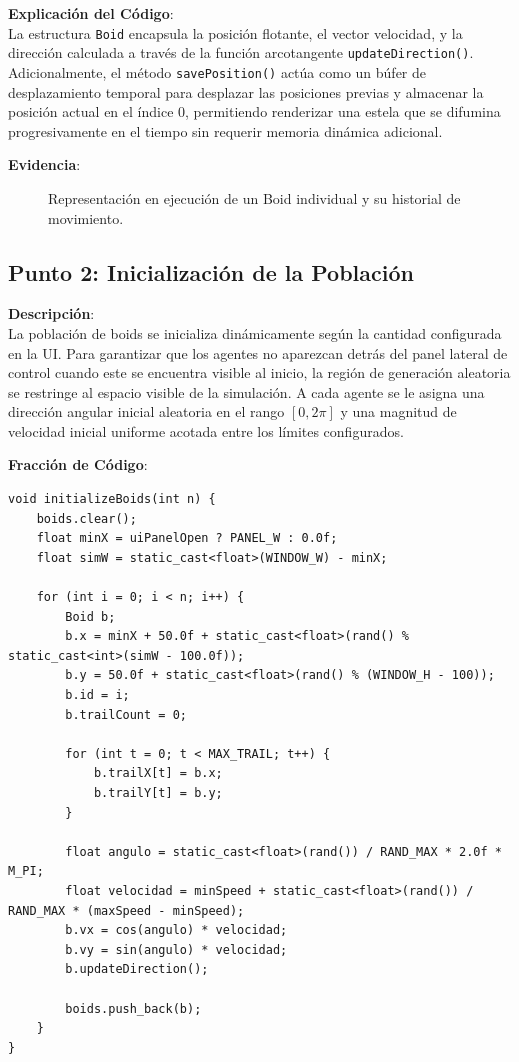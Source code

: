\documentclass[11pt,a4paper]{article}
\begin{document}
\textbf{Explicación del Código}: \\
La estructura \lstinline{Boid} encapsula la posición flotante, el vector velocidad, y la dirección calculada a través de la función arcotangente \lstinline{updateDirection()}. Adicionalmente, el método \lstinline{savePosition()} actúa como un búfer de desplazamiento temporal para desplazar las posiciones previas y almacenar la posición actual en el índice $0$, permitiendo renderizar una estela que se difumina progresivamente en el tiempo sin requerir memoria dinámica adicional.

\textbf{Evidencia}:
\begin{figure}[htbp]
    \centering
    \caption{Representación en ejecución de un Boid individual y su historial de movimiento.}
    \label{fig:evidencia_punto1}
\end{figure}

\newpage

\subsection{Punto 2: Inicialización de la Población}
\textbf{Descripción}: \\
La población de boids se inicializa dinámicamente según la cantidad configurada en la UI. Para garantizar que los agentes no aparezcan detrás del panel lateral de control cuando este se encuentra visible al inicio, la región de generación aleatoria se restringe al espacio visible de la simulación. A cada agente se le asigna una dirección angular inicial aleatoria en el rango $[0, 2\pi]$ y una magnitud de velocidad inicial uniforme acotada entre los límites configurados.

\textbf{Fracción de Código}:
\begin{lstlisting}[caption={Inicialización aleatoria de Boids en simulacion.cpp}, label={lst:init_boids}]
void initializeBoids(int n) {
    boids.clear();
    float minX = uiPanelOpen ? PANEL_W : 0.0f;
    float simW = static_cast<float>(WINDOW_W) - minX;

    for (int i = 0; i < n; i++) {
        Boid b;
        b.x = minX + 50.0f + static_cast<float>(rand() % static_cast<int>(simW - 100.0f));
        b.y = 50.0f + static_cast<float>(rand() % (WINDOW_H - 100));
        b.id = i;
        b.trailCount = 0;

        for (int t = 0; t < MAX_TRAIL; t++) {
            b.trailX[t] = b.x;
            b.trailY[t] = b.y;
        }

        float angulo = static_cast<float>(rand()) / RAND_MAX * 2.0f * M_PI;
        float velocidad = minSpeed + static_cast<float>(rand()) / RAND_MAX * (maxSpeed - minSpeed);
        b.vx = cos(angulo) * velocidad;
        b.vy = sin(angulo) * velocidad;
        b.updateDirection();

        boids.push_back(b);
    }
}
\end{lstlisting}
\end{document}
